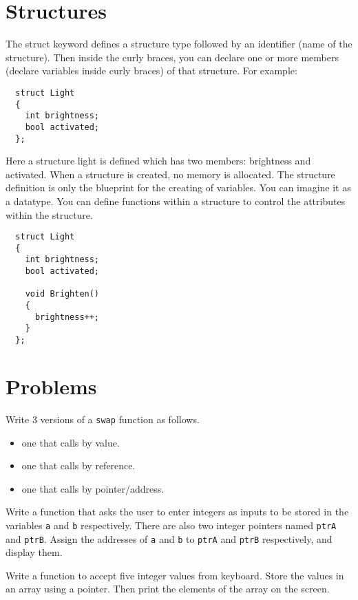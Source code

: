 \documentclass[11pt,fleqn]{book} %
\begin{document}
\section{Structures}
The struct keyword defines a structure type followed by an identifier (name of the structure). Then inside the curly braces, you can declare one or more members (declare variables inside curly braces) of that structure. For example:
\begin{lstlisting}
  struct Light
  {
    int brightness;
    bool activated;
  };
\end{lstlisting}
Here a structure light is defined which has two members: brightness and activated. When a structure is created, no memory is allocated. The structure definition is only the blueprint for the creating of variables. You can imagine it as a datatype. You can define functions within a structure to control the attributes within the structure.
\begin{lstlisting}
  struct Light
  {
    int brightness;
    bool activated;
    
    void Brighten()
    {
      brightness++;
    }
  };
\end{lstlisting}

\section{Problems}


\begin{problem}
  Write 3 versions of a {\tt swap} function as follows.
  \begin{itemize}
  \item one that calls by value.
  \item one that calls by reference.
  \item one that calls by pointer/address.
  \end{itemize}
\end{problem}

\begin{problem}
  Write a function that asks the user to enter integers as inputs to be stored in the variables {\tt a} and {\tt b} respectively. There are also two integer pointers named {\tt ptrA} and {\tt ptrB}. Assign the addresses of {\tt a} and {\tt b} to {\tt ptrA} and {\tt ptrB} respectively, and display them.
\end{problem}

\begin{problem}
  Write a function to accept five integer values from keyboard. Store the values in an array using a pointer. Then print the elements of the array on the screen.
\end{problem}
\end{document}
